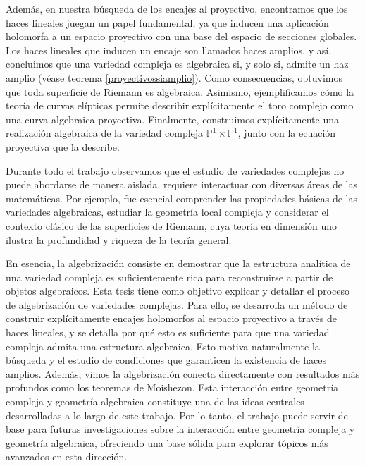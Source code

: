 Además, en nuestra búsqueda de los encajes al proyectivo, encontramos que los haces lineales juegan un papel fundamental, ya que inducen una aplicación holomorfa a un espacio proyectivo con una base del espacio de secciones globales. Los haces lineales que inducen un encaje son llamados haces amplios, y así, concluimos que una variedad compleja es algebraica si, y solo si, admite un haz amplio (véase teorema \ref{proyectivossiamplio}). Como consecuencias, obtuvimos que toda superficie de Riemann es algebraica. Asimismo, ejemplificamos cómo la teoría de curvas elípticas permite describir explícitamente el toro complejo como una curva algebraica proyectiva. Finalmente, construimos explícitamente una realización algebraica de la variedad compleja $\mathbb P^1\times\mathbb P^1$, junto con la ecuación proyectiva que la describe.

Durante todo el trabajo observamos que el estudio de variedades complejas no puede abordarse de manera aislada, requiere interactuar con diversas áreas de las matemáticas. Por ejemplo, fue esencial comprender las propiedades básicas de las variedades algebraicas, estudiar la geometría local compleja y considerar el contexto clásico de las superficies de Riemann, cuya teoría en dimensión uno ilustra la profundidad y riqueza de la teoría general.

En esencia, la algebrización consiste en demostrar que la estructura analítica de una variedad compleja es suficientemente rica para reconstruirse a partir de objetos algebraicos. Esta tesis tiene como objetivo explicar y detallar el proceso de algebrización de variedades complejas. Para ello, se desarrolla un método de construir explícitamente encajes holomorfos al espacio proyectivo a través de haces lineales, y se detalla por qué esto es suficiente para que una variedad compleja admita una estructura algebraica. Esto motiva naturalmente la búsqueda y el estudio de condiciones que garanticen la existencia de haces amplios. Además, vimos la algebrización conecta directamente con resultados más profundos como los teoremas de Moishezon. Esta interacción entre geometría compleja y geometría algebraica constituye una de las ideas centrales desarrolladas a lo largo de este trabajo. Por lo tanto, el trabajo puede servir de base para futuras investigaciones sobre la interacción entre geometría compleja y geometría algebraica, ofreciendo una base sólida para explorar tópicos más avanzados en esta dirección.

